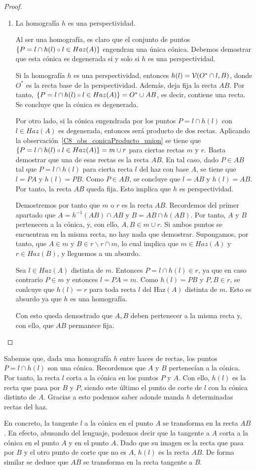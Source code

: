 \begin{proof}
\begin{enumerate}
		\item La homografía $h$ es una perspectividad. 
		
		Al ser una homografía, es claro que el conjunto de puntos $\{P=l\cap h(l)\shortparallel l\in Haz(A)\}$ engendran una única cónica. Debemos demostrar que esta cónica es degenerada si y solo si $h$ es una perspectividad.
		
		Si la homografía $h$ es una perspectividad, entonces $h(l)=\mathcal{V}(O^*\cap l,B)$, donde $O^*$ es la recta base de la perspectividad. Además, deja fija la recta $AB$. Por tanto, $\{P=l\cap h(l)\shortparallel l\in Haz(A)\}=O^*\cup AB$, es decir, contiene una recta. Se concluye que la cónica es degenerada.
		
		Por otro lado, si la cónica engendrada por los puntos $P=l\cap h(l)$ con $l\in Haz(A)$ es degenerada, entonces será producto de dos rectas. Aplicando la observación~\ref{C8_obs_conicaProducto_union} se tiene que $\{P=l\cap h(l)\shortparallel l\in Haz(A)\}=m\cup r$ para ciertas rectas $m$ y $r$. Basta demostrar que una de esas rectas es la recta $AB$. En tal caso, dado $P\in AB$ tal que $P=l\cap h(l)$ para cierta recta $l$ del haz con base $A$, se tiene que $l=PA$ y $h(l)=PB$. Como $P\in AB$, se concluye que $l=AB$ y $h(l)=AB$. Por tanto, la recta $AB$ queda fija. Esto implica que $h$ es perspectividad.
		
		Demostremos por tanto que $m$ o $r$ es la recta $AB$. Recordemos del primer apartado que $A=h^{-1}(AB)\cap AB$ y $B=AB\cap h(AB)$. Por tanto, $A$ y $B$ pertenecen a la cónica, y, con ello, $A,B\in m\cup r$. Si ambos puntos se encuentran en la misma recta, no hay nada que demostrar. Supongamos, por tanto, que $A\in m$ y $B\in r\backslash r\cap m$, lo cual implica que $m\in Haz(A)$ y $r\in Haz(B)$, y lleguemos a un absurdo.
		
		Sea $l\in Haz(A)$ distinta de $m$. Entonces $P=l\cap h(l)\in r$, ya que en caso contrario $P\in m$ y entonces $l=PA=m$. Como $h(l)=PB$ y $P,B\in r$, se conlcuye que $h(l)=r$ para toda recta $l$ del Haz$(A)$ distinta de $m$. Esto es absurdo ya que $h$ es una homografía.
		
		Con esto queda demostrado que $A,B$ deben pertenecer a la misma recta y, con ello, que $AB$ permanece fija.
	\end{enumerate}
\end{proof}
\begin{obs}
	Sabemos que, dada una homografía $h$ entre haces de rectas, los puntos $P=l\cap h(l)$ son una cónica. Recordemos que $A$ y $B$ pertenecían a la cónica. Por tanto, la recta $l$ corta a la cónica en los puntos $P$ y $A$. Con ello,  $h(l)$ es la recta que pasa por $B$ y $P$, siendo este último el punto de corte de $l$ con la cónica distinto de $A$. Gracias a esto podemos saber adonde manda $h$ determinadas rectas del haz. 
	
	En concreto, la tangente $l$ a la cónica en el punto $A$ se transforma en la recta $AB$. En efecto, abusando del lenguaje, podemos decir que la tangente a $A$ corta a la cónica en el punto $A$ y en el punto $A$. Dado que su imagen es la recta que pasa por $B$ y el otro punto de corte que no es $A$, $h(l)$ es la recta $AB$. De forma similar se deduce que $AB$ se transforma en la recta tangente a $B$.
\end{obs}
